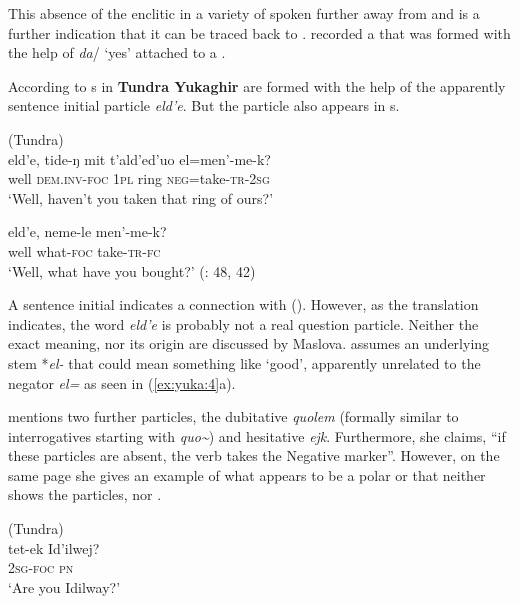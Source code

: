 \noindent This absence of the enclitic in a variety of  spoken further away from  and  is a further indication that it can be traced back to . \citet[254]{Nagasaki2011} recorded a  that was formed with the help of  \textit{da}/ ‘yes’ attached to a .

According to \cite[66f.]{Maslova2003b} s in \textbf{Tundra Yukaghir} are formed with the help of the apparently sentence initial particle \textit{eld’e}. But the particle also appears in s.


\ea%
    \label{ex:yuka:4}
     (Tundra)\\
    \ea
    \gll eld’e,  tide-ŋ    mit  t’ald’ed’uo  el=men’-me-k?\\
    well \textsc{dem.inv-foc}  1\textsc{pl}  ring \textsc{neg}=take-\textsc{tr}-2\textsc{sg}\\
    \glt ‘Well, haven’t you taken that ring of ours?’
    
    \ex
    \gll eld’e, neme-le  men’-me-k?\\
    well  what-\textsc{foc}  take-\textsc{tr}-\textsc{fc}\\
    \glt ‘Well, what have you bought?’ (\citealt{Maslova2001}: 48, 42)
    \z
    \z

\noindent A sentence initial  indicates a connection with  (). However, as the translation indicates, the word \textit{eld’e} is probably not a real question particle. Neither the exact meaning, nor its origin are discussed by Maslova. \cite[154f.]{Nikolaeva2006} assumes an underlying stem *\textit{el-} that could mean something like ‘good’, apparently unrelated to the negator \textit{el=} as seen in (\ref{ex:yuka:4}a).

\cite[66f.]{Maslova2003b} mentions two further particles, the dubitative \textit{quolem} (formally similar to interrogatives starting with \textit{quo{\textasciitilde}}) and hesitative \textit{ejk}. Furthermore, she claims, “if these particles are absent, the verb takes the Negative marker”. However, on the same page she gives an example of what appears to be a polar or  that neither shows the particles, nor .

\ea%
    \label{ex:yuka:5}
     (Tundra)\\
    \gll tet-{ek} Id’ilwej?\\
    2\textsc{sg}-\textsc{foc} \textsc{pn}\\
    \glt ‘Are you Idilway?’ \citep[67]{Maslova2003b}
    \z

